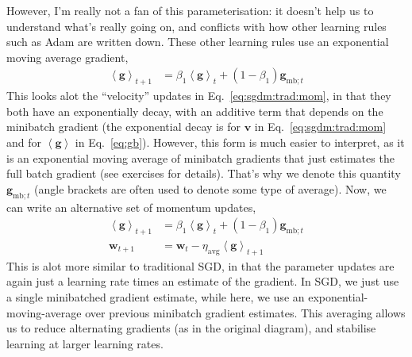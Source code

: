 \documentclass{article}
\newcommand{\bracket}[3]{\left#1 #3 \right#2}
\newcommand{\sqb}{\bracket{[}{]}}
\newcommand{\ab}{\bracket{\langle}{\rangle}}
\newcommand{\0}{\mathbf{0}}
\newcommand{\g}{\mathbf{g}}
\newcommand{\mom}{\mathbf{v}}
\newcommand{\gfb}{\g_\text{fb}}
\newcommand{\gmbt}{\g_{\text{mb}; t}}
\newcommand{\gb}{\mathbf{\ab{g}}}
\newcommand{\w}{\mathbf{w}}
\newcommand{\E}{\operatorname{E}\sqb}
\newcommand{\lravg}{\eta_\text{avg}}
\begin{document}
However, I'm really not a fan of this parameterisation: it doesn't help us to understand what's really going on, and conflicts with how other learning rules such as Adam are written down.
These other learning rules use an exponential moving average gradient,
\begin{align}
  \label{eq:gb}
  \gb_{t+1} &= \beta_1 \gb_{t} + (1-\beta_1) \gmbt
\end{align}
This looks alot the ``velocity'' updates in Eq.~\eqref{eq:sgdm:trad:mom}, in that they both have an exponentially decay, with an additive term that depends on the minibatch gradient (the exponential decay is for $\mom$ in Eq.~\eqref{eq:sgdm:trad:mom} and for $\gb$ in Eq.~\eqref{eq:gb}).
However, this form is much easier to interpret, as it is an exponential moving average of minibatch gradients that just estimates the full batch gradient (see exercises for details).
That's why we denote this quantity $\gmbt$ (angle brackets are often used to denote some type of average).
Now, we can write an alternative set of momentum updates,
\begin{subequations}
\begin{align}
  \label{eq:sgdm:avg:g}
  \gb_{t+1} &= \beta_1 \gb_t + (1-\beta_1) \gmbt\\
  \label{eq:sgdm:avg:w}
  \w_{t+1} &= \w_{t} - \lravg \gb_{t+1}
\end{align}
\end{subequations}
This is alot more similar to traditional SGD, in that the parameter updates are again just a learning rate times an estimate of the gradient.
In SGD, we just use a single minibatched gradient estimate, while here, we use an exponential-moving-average over previous minibatch gradient estimates.
This averaging allows us to reduce alternating gradients (as in the original diagram), and stabilise learning at larger learning rates.
\end{document}
